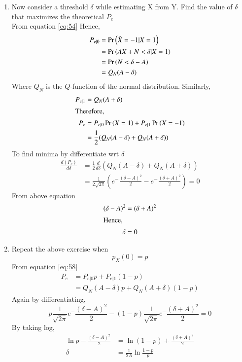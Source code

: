 \documentclass[journal,12pt,twocolumn]{IEEEtran}
\renewcommand\thesection{\arabic{section}}
\begin{document}
\begin{enumerate}[label=\thesection.\arabic*
,ref=\thesection.\theenumi]
\item Now consider a threshold $\delta$ while estimating X from Y. Find the value of $\delta$ that maximizes the theoretical $P_e$\\
\solution From equation \eqref{eq:54}
Hence,
\begin{align*}
P_{e|0} &= \Pr\left(\hat{X} = -1 | X = 1\right) \\
&= \Pr\left(AX+N < \delta | X = 1\right) \\
&= \Pr\left(N < \delta - A\right) \\
&= Q_N(A - \delta) \\
\end{align*}
Where $Q_N$ is the $Q$-function of the normal distribution. Similarly,
\begin{align}
P_{e|1} &= Q_N(A+\delta) \\
\intertext{Therefore,}
P_e &= P_{e|0} \Pr\left(X = 1\right) + P_{e|1} \Pr\left(X = -1\right) \\ \label{eq:58}
&= \frac{1}{2}(Q_N(A - \delta) + Q_N(A + \delta)) \\
\end{align}
To find minima by differentiate wrt $\delta$
\begin{align*}
\frac{d(P_e)}{d \delta} &= \frac{1}{2}\frac{d}{d \delta}(Q_N(A - \delta)+Q_N(A+\delta))\\ 
&= \frac{1}{2\sqrt{2 \pi}}(e^-{\frac{(\delta - A)^2}{2}} - e^-{\frac{(\delta + A)^2}{2}}) = 0
\end{align*}
From above equation 
\begin{align*}
(\delta - A)^2 &= (\delta + A)^2\\
\intertext{Hence,}
\delta &= 0
\end{align*}

\item Repeat the above exercise when
\begin{equation}
p_X(0) = p
\end{equation}
\solution From equation \ref{eq:58}
\begin{align*}
P_e &= P_{e|0}p + P_{e|1}(1-p)\\
&= Q_N(A-\delta) p + Q_N(A+\delta) (1-p)
\end{align*}
Again by differentiating,
\begin{equation*}
p\frac{1}{\sqrt{2 \pi}}e^-{\frac{(\delta - A)^2}{2}} - (1-p)\frac{1}{\sqrt{2 \pi}}e^-{\frac{(\delta + A)^2}{2}} = 0
\end{equation*}
By taking log,
\begin{align*}
\ln p- \frac{(\delta - A)^2}{2} &= \ln(1-p) + \frac{(\delta + A)^2}{2}\\
\delta &= \frac{1}{2A} \ln \frac{1-p}{p}
\end{align*}


\end{enumerate}
\end{document}
